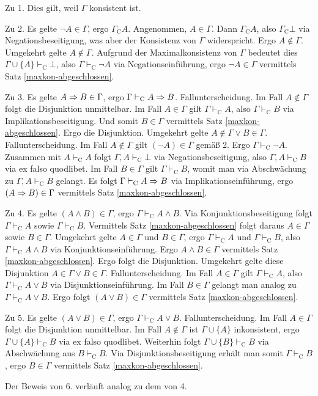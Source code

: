 \begin{Beweis}
Zu 1. Dies gilt, weil $\Gamma$ konsistent ist.

Zu 2. Es gelte $\lnot A\in\Gamma$, ergo $\Gamma_{\mathrm C} A$.
Angenommen, $A\in\Gamma$. Dann $\Gamma_{\mathrm C} A$, also
$\Gamma_{\mathrm C}\bot$ via Negationsbeseitigung, was aber der
Konsistenz von $\Gamma$ widerspricht. Ergo $A\notin\Gamma$.
Umgekehrt gelte $A\notin\Gamma$. Aufgrund der Maximalkonsistenz
von $\Gamma$ bedeutet dies $\Gamma\cup\{A\}\vdash_{\mathrm C}\bot$,
also $\Gamma\vdash_{\mathrm C}\lnot A$ via Negationseinführung,
ergo $\lnot A\in\Gamma$ vermittels Satz \ref{maxkon-abgeschlossen}.

Zu 3. Es gelte $A\Rightarrow B\in\Gamma$, ergo $\Gamma\vdash_{\mathrm C}A\Rightarrow B$.
Fallunterscheidung. Im Fall $A\notin\Gamma$ folgt die Disjunktion
unmittelbar. Im Fall $A\in\Gamma$ gilt $\Gamma\vdash_{\mathrm C} A$,
also $\Gamma\vdash_{\mathrm C}B$ via Implikationsbeseitigung.
Und somit $B\in\Gamma$ vermittels Satz \ref{maxkon-abgeschlossen}.
Ergo die Disjunktion. Umgekehrt gelte $A\notin\Gamma\lor B\in\Gamma$.
Fallunterscheidung. Im Fall $A\notin\Gamma$ gilt $(\lnot A)\in\Gamma$
gemäß 2. Ergo $\Gamma\vdash_{\mathrm C}\lnot A$. Zusammen mit
$A\vdash_{\mathrm C} A$ folgt $\Gamma,A\vdash_{\mathrm C}\bot$
via Negationsbeseitigung, also $\Gamma,A\vdash_{\mathrm C}B$ via
ex falso quodlibet. Im Fall $B\in\Gamma$ gilt $\Gamma\vdash_{\mathrm C}B$,
womit man via Abschwächung zu $\Gamma,A\vdash_{\mathrm C} B$ gelangt.
Es folgt $\Gamma\vdash_{\mathrm C}A\Rightarrow B$ via Implikationseinführung,
ergo $(A\Rightarrow B)\in\Gamma$ vermittels Satz \ref{maxkon-abgeschlossen}.

Zu 4. Es gelte $(A\land B)\in\Gamma$, ergo $\Gamma\vdash_{\mathrm C}A\land B$.
Via Konjunktionsbeseitigung folgt $\Gamma\vdash_{\mathrm C}A$ sowie
$\Gamma\vdash_{\mathrm C}B$. Vermittels Satz \ref{maxkon-abgeschlossen}
folgt daraus $A\in\Gamma$ sowie $B\in\Gamma$. Umgekehrt gelte
$A\in\Gamma$ und $B\in\Gamma$, ergo $\Gamma\vdash_{\mathrm C}A$
und $\Gamma\vdash_{\mathrm C}B$, also $\Gamma\vdash_{\mathrm C}A\land B$
via Konjunktionseinführung. Ergo $A\land B\in\Gamma$ vermittels Satz
\ref{maxkon-abgeschlossen}. Ergo folgt die Disjunktion. Umgekehrt
gelte diese Disjunktion $A\in\Gamma\lor B\in\Gamma$. Fallunterscheidung.
Im Fall $A\in\Gamma$ gilt $\Gamma\vdash_{\mathrm C} A$, also
$\Gamma\vdash_{\mathrm C} A\lor B$ via Disjunktionseinführung.
Im Fall $B\in\Gamma$ gelangt man analog zu $\Gamma\vdash_{\mathrm C} A\lor B$.
Ergo folgt $(A\lor B)\in\Gamma$ vermittels Satz \ref{maxkon-abgeschlossen}.

Zu 5. Es gelte $(A\lor B)\in\Gamma$, ergo
$\Gamma\vdash_{\mathrm C}A\lor B$. Fallunterscheidung. Im Fall
$A\in\Gamma$ folgt die Disjunktion unmittelbar. Im Fall $A\notin\Gamma$
ist $\Gamma\cup\{A\}$ inkonsistent, ergo $\Gamma\cup\{A\}\vdash_{\mathrm C} B$
via ex falso quodlibet. Weiterhin folgt $\Gamma\cup\{B\}\vdash_{\mathrm C} B$
via Abschwächung aus $B\vdash_{\mathrm C} B$. Via Disjunktionsbeseitigung
erhält man somit $\Gamma\vdash_{\mathrm C} B$, ergo $B\in\Gamma$
vermittels Satz \ref{maxkon-abgeschlossen}.

Der Beweis von 6. verläuft analog zu dem von 4.\,\qedsymbol
\end{Beweis}

